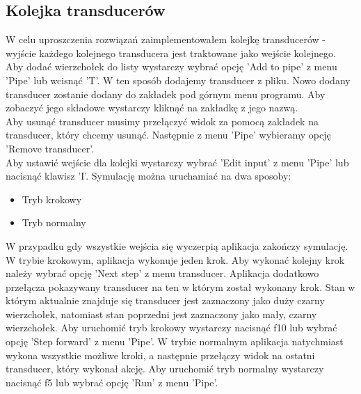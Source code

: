 \documentclass[declaration,shortabstract]{iithesis}
\theoremstyle{definition}
\theoremstyle{plain}
\begin{document}
\subsection {Kolejka transducerów}
W celu uproszczenia rozwiązań zaimplementowałem kolejkę transducerów - wyjście każdego kolejnego transducera jest traktowane jako wejście kolejnego.\\ 
Aby dodać wierzchołek do listy wystarczy wybrać opcję 'Add to pipe' z menu 'Pipe' lub wcisnąć 'T'. W ten sposób dodajemy transducer z pliku. Nowo dodany transducer zostanie dodany do zakładek pod górnym menu programu. Aby zobaczyć jego składowe wystarczy kliknąć na zakładkę z jego nazwą.\\
Aby usunąć transducer musimy przełączyć widok za pomocą zakładek na transducer, który chcemy usunąć. Następnie z menu 'Pipe' wybieramy opcję 'Remove transducer'.\\
Aby ustawić wejście dla kolejki wystarczy wybrać 'Edit input' z menu 'Pipe' lub nacisnąć klawisz 'I'.  Symulację można uruchamiać na dwa sposoby:
\begin{itemize}
\item Tryb krokowy
\item Tryb normalny
\end{itemize}
W przypadku gdy wszystkie wejścia się wyczerpią aplikacja zakończy symulację.
W trybie krokowym, aplikacja wykonuje jeden krok. Aby wykonać kolejny krok należy wybrać opcję 'Next step' z menu transducer. Aplikacja dodatkowo przełącza pokazywany transducer na ten w którym został wykonany krok. Stan w którym aktualnie znajduje się transducer jest zaznaczony jako duży czarny wierzchołek, natomiast stan poprzedni jest zaznaczony jako mały, czarny wierzchołek. Aby uruchomić tryb krokowy wystarczy nacisnąć f10 lub wybrać opcję 'Step forward' z menu 'Pipe'.
W trybie normalnym aplikacja natychmiast wykona wszystkie możliwe kroki, a następnie przełączy widok na ostatni transducer, który wykonał akcję. Aby uruchomić tryb normalny wystarczy nacisnąć f5 lub wybrać opcję 'Run' z menu 'Pipe'.
\end{document}
